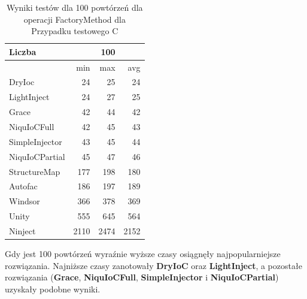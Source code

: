\documentclass[12pt]{article}
\begin{document}
\begin{table}[H]
\captionsetup{belowskip=0pt,aboveskip=0pt}
\begin{center}
\begin{small}
	\begin{tabular}{ | l | r r r | }
    		\hline
Liczba & & 100 & \\ \hline
 & min & max & avg \\ \hline
DryIoc & 24 & 25 & 24 \\ \hline
LightInject & 24 & 27 & 25 \\ \hline
Grace & 42 & 44 & 42 \\ \hline
NiquIoCFull & 42 & 45 & 43 \\ \hline
SimpleInjector & 43 & 45 & 44 \\ \hline
NiquIoCPartial & 45 & 47 & 46 \\ \hline
StructureMap & 177 & 198 & 180 \\ \hline
Autofac & 186 & 197 & 189 \\ \hline
Windsor & 366 & 378 & 369 \\ \hline
Unity & 555 & 645 & 564 \\ \hline
Ninject & 2110 & 2474 & 2152 \\ \hline
  	\end{tabular}
\end{small}
\end{center}
\caption{Wyniki testów dla 100 powtórzeń dla operacji FactoryMethod dla Przypadku testowego C}
\label{TestCaseC_FactoryMethod100}
\end{table}
Gdy jest 100 powtórzeń wyraźnie wyższe czasy osiągnęły najpopularniejsze rozwiązania. Najniższe czasy zanotowały \textbf{DryIoC} oraz \textbf{LightInject}, a pozostałe rozwiązania (\textbf{Grace}, \textbf{NiquIoCFull}, \textbf{SimpleInjector} i \textbf{NiquIoCPartial}) uzyskały podobne wyniki.
\\ \\
\end{document}
